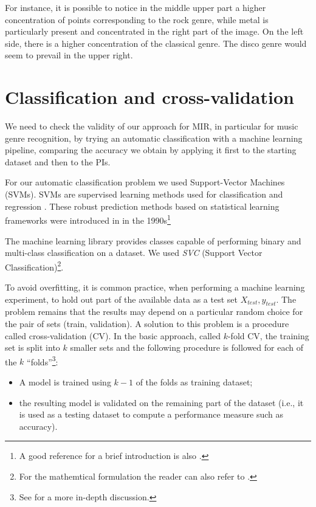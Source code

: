 \documentclass[english, LaM, oneside, noexaminfo]{sapthesis}
\begin{document}
For instance, it is possible to notice in the middle upper part a higher concentration of points corresponding to the rock genre, while metal is particularly present and concentrated in the right part of the image. On the left side, there is a higher concentration of the classical genre. The disco genre would seem to prevail in the upper right.

\section{Classification and cross-validation}


We need to check the validity of our approach for MIR, in particular for music genre recognition, by trying an automatic classification with a machine learning pipeline, comparing the accuracy we obtain by applying it first to the starting dataset and then to the PIs.

For our automatic classification problem we used Support-Vector Machines (SVMs). SVMs are supervised learning methods used for classification and regression \cite{scikit-learn}. These robust prediction methods based on statistical learning frameworks were introduced in \cite{boser1992training} in the 1990s\footnote{A good reference for a brief introduction is also \cite{evgeniou1999support}.}

The machine learning library \cite{scikit-learn} provides classes capable of performing binary and multi-class classification on a dataset. We used \textit{SVC} (Support Vector Classification)\footnote{For the mathemtical formulation the reader can also refer to \cite{scikit-learn}.}.

To avoid overfitting, it is common practice, when performing a machine learning experiment, to hold out part of the available data as a test set $X_{test}, y_{test}$. The problem remains that the results may depend on a particular random choice for the pair of sets (train, validation). A solution to this problem is a procedure called cross-validation (CV). In the basic approach, called $k$-fold CV, the training set is split into $k$ smaller sets and the following procedure is followed for each of the $k$ “folds”\footnote{See \cite{scikit-learn} for a more in-depth discussion.}:
\begin{itemize}
    \item A model is trained using $k-1$ of the folds as training dataset;
    \item the resulting model is validated on the remaining part of the dataset (i.e., it is used as a testing dataset to compute a performance measure such as accuracy).
\end{itemize}
\end{document}
